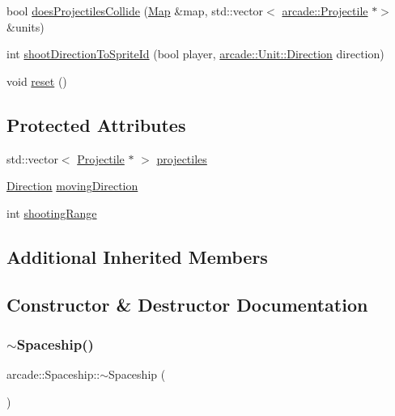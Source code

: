 \begin{DoxyCompactItemize}
\item 
bool \hyperlink{classarcade_1_1_spaceship_af23a861c85c36e432e195ab3cd239058}{does\+Projectiles\+Collide} (\hyperlink{classarcade_1_1_map}{Map} \&map, std\+::vector$<$ \hyperlink{classarcade_1_1_projectile}{arcade\+::\+Projectile} $\ast$$>$ \&units)
\item 
int \hyperlink{classarcade_1_1_spaceship_a7c78ae50bdcb260920a96fb3eb703449}{shoot\+Direction\+To\+Sprite\+Id} (bool player, \hyperlink{classarcade_1_1_unit_af418afeaba1f7fd5934b6ae1343215dd}{arcade\+::\+Unit\+::\+Direction} direction)
\item 
void \hyperlink{classarcade_1_1_spaceship_ab99c1fba278325a45c67224583d800be}{reset} ()
\end{DoxyCompactItemize}
\subsection*{Protected Attributes}
\begin{DoxyCompactItemize}
\item 
std\+::vector$<$ \hyperlink{classarcade_1_1_projectile}{Projectile} $\ast$ $>$ \hyperlink{classarcade_1_1_spaceship_aa91863f21c7e3c05edb90fe3ec3a5ff2}{projectiles}
\item 
\hyperlink{classarcade_1_1_unit_af418afeaba1f7fd5934b6ae1343215dd}{Direction} \hyperlink{classarcade_1_1_spaceship_a0ac1911c03d0f728e70fca2a9ae01ab2}{moving\+Direction}
\item 
int \hyperlink{classarcade_1_1_spaceship_a414281f267135317527aeb86e170d892}{shooting\+Range}
\end{DoxyCompactItemize}
\subsection*{Additional Inherited Members}


\subsection{Constructor \& Destructor Documentation}
\mbox{\label{classarcade_1_1_spaceship_ada9cb897bb55ceff50c40228c8307f66}} 
\subsubsection{\texorpdfstring{$\sim$\+Spaceship()}{~Spaceship()}}
{\footnotesize\ttfamily arcade\+::\+Spaceship\+::$\sim$\+Spaceship (\begin{DoxyParamCaption}{ }\end{DoxyParamCaption})\hspace{0.3cm}{\ttfamily [virtual]}}

